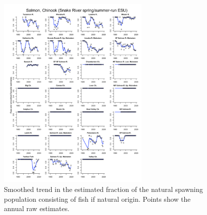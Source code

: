\documentclass[
  letterpaper,
  oneside,
  open=any]{scrbook}
\begin{document}
\begin{figure}

{\centering \includegraphics[width=2.92in,height=\textheight]{content/Interior_Columbia/../../media/image28.png}

}

\caption{\label{fig-SnR-SS-smoothed-frac-wild}Smoothed trend in the
estimated fraction of the natural spawning population consisting of fish
if natural origin. Points show the annual raw estimates.}

\end{figure}
\end{document}
